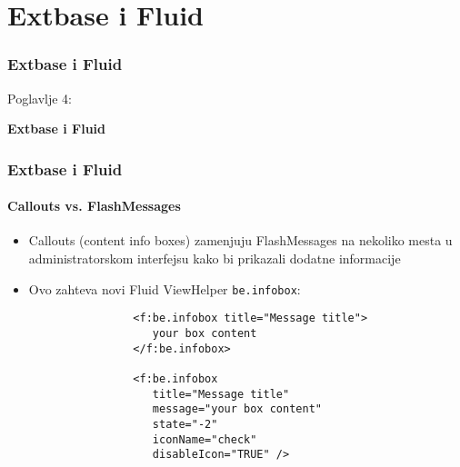 %

\section{Extbase i Fluid}
\begin{frame}[fragile]
	\frametitle{Extbase i Fluid}

	\begin{center}\huge{Poglavlje 4:}\end{center}
	\begin{center}\huge{\color{typo3darkgrey}\textbf{Extbase i Fluid}}\end{center}

\end{frame}


\begin{frame}[fragile]
	\frametitle{Extbase i Fluid}
	\framesubtitle{Callouts vs. FlashMessages}

	\begin{itemize}

		\item Callouts (content info boxes) zamenjuju FlashMessages na nekoliko mesta u administratorskom interfejsu kako bi prikazali dodatne informacije

		\item Ovo zahteva novi Fluid ViewHelper \texttt{be.infobox}:

			\begin{lstlisting}
				<f:be.infobox title="Message title">
				   your box content
				</f:be.infobox>

				<f:be.infobox
				   title="Message title"
				   message="your box content"
				   state="-2"
				   iconName="check"
				   disableIcon="TRUE" />
			\end{lstlisting}

	\end{itemize}

\end{frame}

